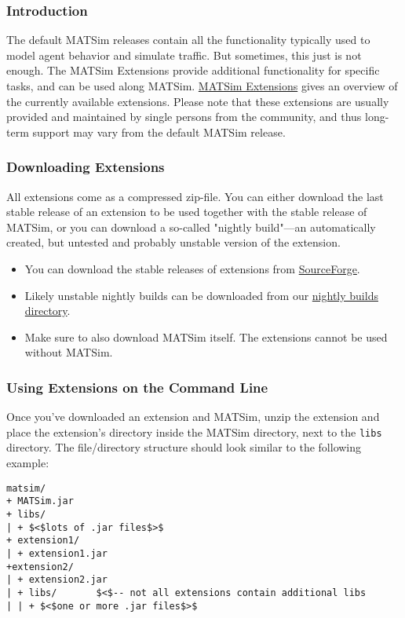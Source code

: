 \documentclass[a4paper,11pt]{report}
\begin{document}
\subsubsection{Introduction}

The default MATSim releases contain all the functionality typically  used to model agent behavior and simulate traffic. But sometimes, this  just is not enough. The MATSim Extensions provide additional  functionality for specific tasks, and can be used along MATSim. \href{http://www.matsim.org/extensions}{MATSim Extensions}  gives an overview of the currently available extensions. Please note  that these extensions are usually provided and maintained by single  persons from the community, and thus long-term support may vary from the  default MATSim release.

\subsubsection{Downloading Extensions}

All extensions come as a compressed zip-file. You can either download  the last stable release of an extension to be used together with the  stable release of MATSim, or you can download a so-called "nightly  build"—an automatically created, but untested and probably unstable  version of the extension.
\begin{itemize}
	\item You can download the stable releases of extensions from \href{http://sourceforge.net/projects/matsim/files/MATSim/}{SourceForge}.
	\item Likely unstable nightly builds can be downloaded from our \href{http://matsim.org/files/builds/}{nightly builds directory}.
	\item Make sure to also download MATSim itself. The extensions cannot be used without MATSim.
\end{itemize}

\subsubsection{Using Extensions on the Command Line}

Once you've downloaded an extension and MATSim, unzip the extension  and place the extension's directory inside the MATSim directory, next to  the 
\texttt{libs} directory. The file/directory structure should look similar to the following example:
\begin{verbatim}
matsim/
+ MATSim.jar
+ libs/
| + $<$lots of .jar files$>$
+ extension1/
| + extension1.jar
+extension2/
| + extension2.jar
| + libs/       $<$-- not all extensions contain additional libs
| | + $<$one or more .jar files$>$
\end{verbatim}
\end{document}
